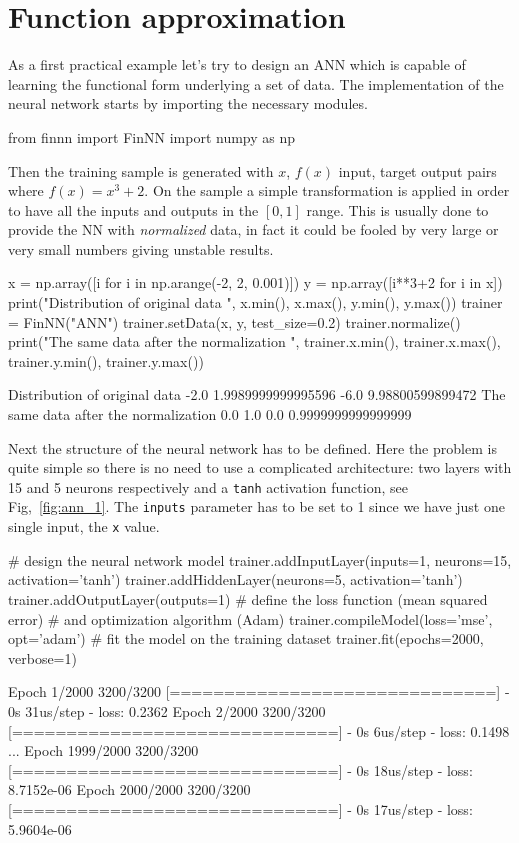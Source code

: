 \section{Function approximation}
\label{function-approximation}

As a first practical example let's try to design an ANN which is capable of learning the functional form underlying a set of data. The implementation of the neural network starts by importing the necessary modules.

\begin{ipython}
from finnn import FinNN
import numpy as np
\end{ipython}

Then the training sample is generated with \(x\), \(f(x)\)  input, target output pairs where \(f(x) = x^3 +2\). On the sample a simple transformation is applied in order to have all the inputs and outputs in the \([0, 1]\) range. This is usually done to provide the NN with \emph{normalized} data, in fact it could be fooled by very large or very small numbers giving unstable results.

\begin{ipython}
x = np.array([i for i in np.arange(-2, 2, 0.001)])
y = np.array([i**3+2 for i in x])
print("Distribution of original data ", x.min(), x.max(), y.min(), y.max())
trainer = FinNN("ANN")
trainer.setData(x, y, test_size=0.2)
trainer.normalize()
print("The same data after the normalization ", trainer.x.min(),
       trainer.x.max(), trainer.y.min(), trainer.y.max())
\end{ipython}
\begin{ioutput}
Distribution of original data  -2.0 1.9989999999995596 -6.0 9.98800599899472
The same data after the normalization  0.0 1.0 0.0 0.9999999999999999
\end{ioutput}

Next the structure of the neural network has to be defined. 
Here the problem is quite simple so there is no need to use a complicated architecture: two layers with 15 and 5 neurons respectively and a \texttt{tanh} activation function, see Fig,~\ref{fig:ann_1}. The \texttt{inputs} parameter has to be set to 1 since we have just one single input, the \texttt{x} value.

\begin{ipython}
# design the neural network model
trainer.addInputLayer(inputs=1, neurons=15, activation='tanh')
trainer.addHiddenLayer(neurons=5, activation='tanh')
trainer.addOutputLayer(outputs=1)
# define the loss function (mean squared error)
# and optimization algorithm (Adam)
trainer.compileModel(loss='mse', opt='adam')
# fit the model on the training dataset
trainer.fit(epochs=2000, verbose=1)
\end{ipython}
\begin{ioutput}
Epoch 1/2000
3200/3200 [==============================] - 0s 31us/step - loss: 0.2362
Epoch 2/2000
3200/3200 [==============================] - 0s 6us/step - loss: 0.1498
...
Epoch 1999/2000
3200/3200 [==============================] - 0s 18us/step - loss: 8.7152e-06
Epoch 2000/2000
3200/3200 [==============================] - 0s 17us/step - loss: 5.9604e-06
\end{ioutput}

